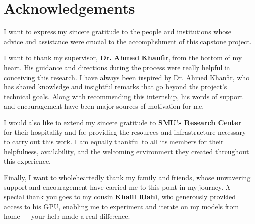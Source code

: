 \section*{Acknowledgements}
I want to express my sincere gratitude to the people and institutions whose advice and assistance were crucial to the accomplishment of this capstone project.

\noindent \newline
I want to thank my supervisor, \textbf{Dr. Ahmed Khanfir}, from the bottom of my heart. His guidance and directions during the process were really helpful in conceiving this research. I have always been inspired by Dr. Ahmed Khanfir, who has shared knowledge and insightful remarks that go beyond the project's technical goals. Along with recommending this internship, his words of support and encouragement have been major sources of motivation for me.

\noindent \newline
I would also like to extend my sincere gratitude to \textbf{SMU's Research Center} for their hospitality and for providing the resources and infrastructure necessary to carry out this work. I am equally thankful to all its members for their helpfulness, availability, and the welcoming environment they created throughout this experience.

\noindent \newline
Finally, I want to wholeheartedly thank my family and friends, whose unwavering support and encouragement have carried me to this point in my journey. A special thank you goes to my cousin \textbf{Khalil Riahi}, who generously provided access to his GPU, enabling me to experiment and iterate on my models from home — your help made a real difference.


\vspace{1.4cm}
\noindent